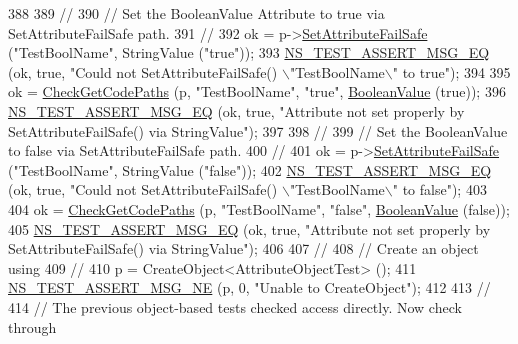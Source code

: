 \begin{DoxyCode}
388 
389   \textcolor{comment}{//}
390   \textcolor{comment}{// Set the BooleanValue Attribute to true via SetAttributeFailSafe path.}
391   \textcolor{comment}{//}
392   ok = p->\hyperlink{classns3_1_1ObjectBase_aa7d333004e970f925a4ed5df275541b5}{SetAttributeFailSafe} (\textcolor{stringliteral}{"TestBoolName"}, StringValue (\textcolor{stringliteral}{"true"}));
393   \hyperlink{group__testing_ga2a9d78cffb3db8e867c35fff0b698cf5}{NS\_TEST\_ASSERT\_MSG\_EQ} (ok, \textcolor{keyword}{true}, \textcolor{stringliteral}{"Could not SetAttributeFailSafe() \(\backslash\)"TestBoolName\(\backslash\)"
       to true"});
394 
395   ok = \hyperlink{classAttributeTestCase_a902fb84c803f1c898329f9263575331e}{CheckGetCodePaths} (p, \textcolor{stringliteral}{"TestBoolName"}, \textcolor{stringliteral}{"true"}, 
      \hyperlink{classns3_1_1BooleanValue}{BooleanValue} (\textcolor{keyword}{true}));
396   \hyperlink{group__testing_ga2a9d78cffb3db8e867c35fff0b698cf5}{NS\_TEST\_ASSERT\_MSG\_EQ} (ok, \textcolor{keyword}{true}, \textcolor{stringliteral}{"Attribute not set properly by
       SetAttributeFailSafe() via StringValue"});
397 
398   \textcolor{comment}{//}
399   \textcolor{comment}{// Set the BooleanValue to false via SetAttributeFailSafe path.}
400   \textcolor{comment}{//}
401   ok = p->\hyperlink{classns3_1_1ObjectBase_aa7d333004e970f925a4ed5df275541b5}{SetAttributeFailSafe} (\textcolor{stringliteral}{"TestBoolName"}, StringValue (\textcolor{stringliteral}{"false"}));
402   \hyperlink{group__testing_ga2a9d78cffb3db8e867c35fff0b698cf5}{NS\_TEST\_ASSERT\_MSG\_EQ} (ok, \textcolor{keyword}{true}, \textcolor{stringliteral}{"Could not SetAttributeFailSafe() \(\backslash\)"TestBoolName\(\backslash\)"
       to false"});
403 
404   ok = \hyperlink{classAttributeTestCase_a902fb84c803f1c898329f9263575331e}{CheckGetCodePaths} (p, \textcolor{stringliteral}{"TestBoolName"}, \textcolor{stringliteral}{"false"}, 
      \hyperlink{classns3_1_1BooleanValue}{BooleanValue} (\textcolor{keyword}{false}));
405   \hyperlink{group__testing_ga2a9d78cffb3db8e867c35fff0b698cf5}{NS\_TEST\_ASSERT\_MSG\_EQ} (ok, \textcolor{keyword}{true}, \textcolor{stringliteral}{"Attribute not set properly by
       SetAttributeFailSafe() via StringValue"});
406 
407   \textcolor{comment}{//}
408   \textcolor{comment}{// Create an object using}
409   \textcolor{comment}{//}
410   p = CreateObject<AttributeObjectTest> ();
411   \hyperlink{group__testing_ga73d66fb0050a5111453fd144e767b91a}{NS\_TEST\_ASSERT\_MSG\_NE} (p, 0, \textcolor{stringliteral}{"Unable to CreateObject"});
412 
413   \textcolor{comment}{//}
414   \textcolor{comment}{// The previous object-based tests checked access directly.  Now check through}

\end{DoxyCode}
